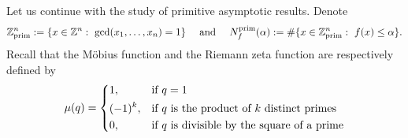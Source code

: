\documentclass[11pt]{article}
\newtheorem{example}[theorem]{Example}
\theoremstyle{definition}
\numberwithin{equation}{section}
\newtheorem{remark}[theorem]{Remark}
\newcommand{\R}{\mathbb{R}}
\newcommand{\Z}{\mathbb{Z}}
\begin{document}



Let us continue with the study of primitive asymptotic results.
Denote
\[
\Z^n_{\rm prim}:=\{x\in\Z^n:\ \gcd(x_1,\dots,x_n)=1\} \quad \text{ and } \quad  N^{\rm prim}_f(\alpha):=\#\{x\in\Z^n_{\rm prim}:\ f(x)\le \alpha\}.
\]
Recall that the M\"obius function and the Riemann zeta function
are respectively defined by
\[
\mu(q) =
    \begin{dcases}
        1, & \text{if } q = 1\\
        (-1)^k, & \text{if } q \text{ is the product of } k \text{ distinct primes}\\
        0, & \text{if } q \text{ is divisible by the square of a prime}
    \end{dcases}
\]
\end{document}
